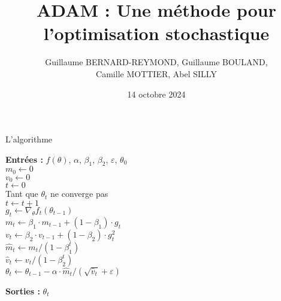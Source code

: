 \documentclass[11pt,aspectratio=169,xcolor=dvipsnames]{beamer}
\title{ADAM : Une méthode pour l'optimisation stochastique}
\author{Guillaume BERNARD-REYMOND, Guillaume BOULAND,\\ Camille MOTTIER, Abel SILLY}
\date{14 octobre 2024}
\begin{document}
\frame{\titlepage}




\begin{frame}{L'algorithme}

\textbf{Entrées :} $f(\theta)$, $\alpha$, $\beta_1$, $\beta_2$, $\varepsilon$, $\theta_0$\\
\hspace*{0.5cm}   $m_0\longleftarrow 0$ \\
\hspace*{0.5cm}  $v_0\longleftarrow 0$ \\  
\hspace*{0.5cm}  $t\longleftarrow 0$ \\
\hspace*{0.5cm}Tant que $\theta_t$ ne converge pas\\
   \hspace*{1.5cm} $t\longleftarrow t+1$\\
   \hspace*{1.5cm} $g_t \longleftarrow \nabla_{\theta}f_t(\theta_{t-1})$\\
  \hspace*{1.5cm}  $m_t \longleftarrow \beta_1\cdotp m_{t-1}+(1-\beta_1)\cdotp g_t$\\
   \hspace*{1.5cm} $v_t \longleftarrow \beta_2\cdotp v_{t-1}+(1-\beta_2)\cdotp g_t^2$\\
   \hspace*{1.5cm} $\widehat m_t \longleftarrow m_t/(1-\beta_1^t)$\\
   \hspace*{1.5cm} $\widehat v_t \longleftarrow v_t/(1-\beta_2^t)$\\
   \hspace*{1.5cm} $\theta_t \longleftarrow \theta_{t-1}-\alpha\cdotp \widehat m_t/(\sqrt{\widehat v_t}+\varepsilon)$
  
\hspace*{0.5cm} \textbf{Sorties :} $\theta_t$
\end{frame}
\end{document}
